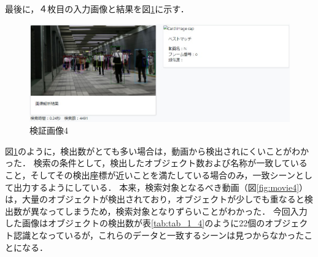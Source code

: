 \documentclass[a4j,12pt,dvipdfmx]{jreport}
\begin{document}
最後に，４枚目の入力画像と結果を図\ref{fig:img_1-4}に示す．
\begin{figure}[b]
  \centering
  \includegraphics[width=13cm]{image/result_1_4.jpg}
  \caption{検証画像4}
  \label{fig:img_1-4}
\end{figure}

図\ref{fig:img_1-4}のように，検出数がとても多い場合は，動画から検出されにくいことがわかった．
検索の条件として，検出したオブジェクト数および名称が一致していること，そしてその検出座標が近いことを満たしている場合のみ，一致シーンとして出力するようにしている．
本来，検索対象となるべき動画（図\ref{fig:movie4}）は，大量のオブジェクトが検出されており，オブジェクトが少しでも重なると検出数が異なってしまうため，検索対象となりずらいことがわかった．
今回入力した画像はオブジェクトの検出数が表\ref{tab:tab_1_4}のように22個のオブジェクト認識となっているが，これらのデータと一致するシーンは見つからなかったことになる．
\end{document}
